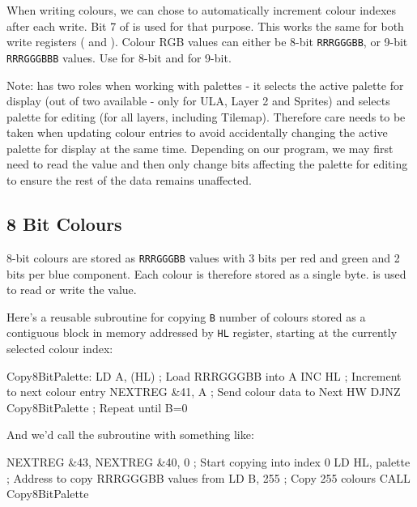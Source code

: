 When writing colours, we can chose to automatically increment colour indexes after each write. Bit 7 of  is used for that purpose. This works the same for both write registers ( and ). Colour RGB values can either be 8-bit {\tt RRRGGGBB}, or 9-bit {\tt RRRGGGBBB} values. Use  for 8-bit and  for 9-bit.

Note:  has two roles when working with palettes - it selects the active palette for display (out of two available - only for ULA, Layer 2 and Sprites) and selects palette for editing (for all layers, including Tilemap). Therefore care needs to be taken when updating colour entries to avoid accidentally changing the active palette for display at the same time. Depending on our program, we may first need to read the value and then only change bits affecting the palette for editing to ensure the rest of the data remains unaffected.


\subsection{8 Bit Colours}

8-bit colours are stored as {\tt RRRGGGBB} values with 3 bits per red and green and 2 bits per blue component. Each colour is therefore stored as a single byte.  is used to read or write the value.

Here's a reusable subroutine for copying {\tt B} number of colours stored as a contiguous block in memory addressed by {\tt HL} register, starting at the currently selected colour index:

\begin{tcblisting}{}
Copy8BitPalette:
	LD A, (HL)                ; Load RRRGGGBB into A
	INC HL                    ; Increment to next colour entry
	NEXTREG &41, A            ; Send colour data to Next HW
	DJNZ Copy8BitPalette      ; Repeat until B=0
\end{tcblisting}

And we'd call the subroutine with something like:

\begin{tcblisting}{}
	NEXTREG &43, %
	NEXTREG &40, 0            ; Start copying into index 0
	LD HL, palette            ; Address to copy RRRGGGBB values from
	LD B, 255                 ; Copy 255 colours
	CALL Copy8BitPalette
\end{tcblisting}

